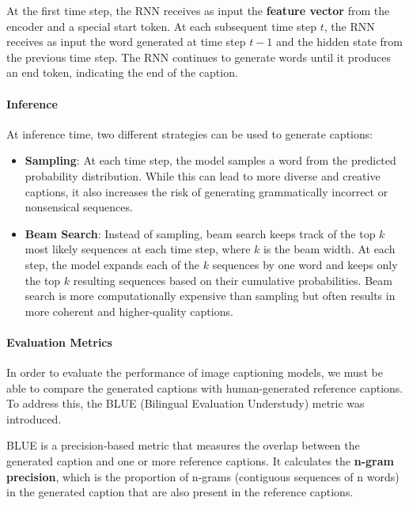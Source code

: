 At the first time step, the RNN receives as input the \textbf{feature vector} from the encoder and a special start token.
At each subsequent time step $t$, the RNN receives as input the word generated at time step $t-1$ and the hidden state from the previous time step.
The RNN continues to generate words until it produces an end token, indicating the end of the caption.

\paragraph{Inference}
At inference time, two different strategies can be used to generate captions:
\begin{itemize}
    \item \textbf{Sampling}: At each time step, the model samples a word from the predicted probability distribution.
    While this can lead to more diverse and creative captions, it also increases the risk of generating grammatically incorrect or nonsensical sequences.
    \item \textbf{Beam Search}: Instead of sampling, beam search keeps track of the top $k$ most likely sequences at each time step, 
    where $k$ is the beam width. At each step, the model expands each of the $k$ sequences by one word and keeps only the top $k$ resulting sequences based on their cumulative probabilities.
    Beam search is more computationally expensive than sampling but often results in more coherent and higher-quality captions.
\end{itemize}

\paragraph{Evaluation Metrics}
In order to evaluate the performance of image captioning models, we must be able to compare the generated captions with
human-generated reference captions. To address this, the BLUE (Bilingual Evaluation Understudy) metric was introduced.

BLUE is a precision-based metric that measures the overlap between the generated caption and one or more reference captions.
It calculates the \textbf{n-gram precision}, which is the proportion of n-grams (contiguous sequences of n words)
in the generated caption that are also present in the reference captions.


